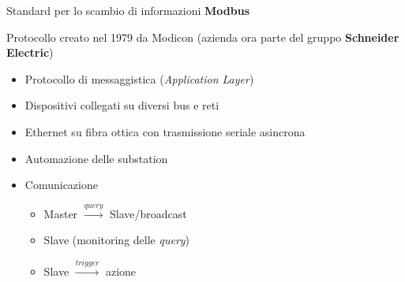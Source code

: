

\begin{frame}{Standard per lo scambio di informazioni}
	\textbf{Modbus}
	\begin{block}{}
	Protocollo creato nel 1979 da Modicon (azienda ora parte del gruppo \textbf{\color{blue_slides}Schneider Electric})
	\end{block}
	\pause
	\begin{itemize}[<+- | alert@+>]
		\item Protocollo di messaggistica (\textit{Application Layer})%
		\item Dispositivi collegati su diversi bus e reti%
		\item Ethernet su fibra ottica con trasmissione seriale asincrona%
		\item Automazione delle substation%
		\item Comunicazione
			\begin{itemize}[<+- | alert@+>]
			\item Master $\xrightarrow{query}$ Slave/broadcast
			\item Slave (monitoring delle \textit{query})
			\item Slave $\xrightarrow{trigger}$ azione
			\end{itemize}
	\end{itemize}
\end{frame}


